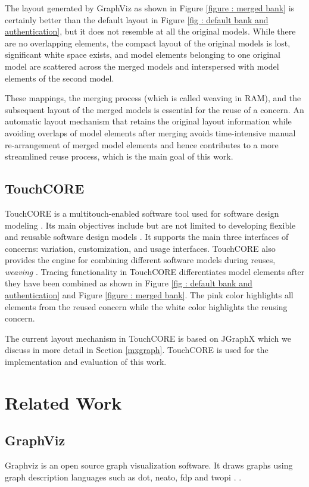 The  layout generated by GraphViz  as shown in Figure \ref{figure : merged bank} is certainly better than the default layout in Figure \ref{fig : default bank and authentication}, but it does not resemble at all the original models. While there are no overlapping elements, the compact layout of the original models is lost, significant white space exists, and model elements belonging to one original model are scattered across the merged models and interspersed with model elements of the second model.

These mappings, the merging process (which is called weaving in RAM), and the subsequent layout of the merged models is essential for the reuse of a concern. An automatic layout mechanism that retains the original layout information while avoiding overlaps of model elements after merging avoids time-intensive manual re-arrangement of merged model elements and hence contributes to a more streamlined reuse process, which is the main goal of this work.

\subsection{TouchCORE} \label{touchcore}
TouchCORE is a multitouch-enabled software tool used for software design modeling \cite{TouchCORE}. Its main objectives include but are not limited to developing flexible and reusable software design models \cite{kienzle2012b}. It supports the main three interfaces of concerns: variation, customization, and usage interfaces. TouchCORE also provides the engine for combining different software models during reuses, \textit{weaving} \cite{kienzle2012b}. Tracing functionality in TouchCORE differentiates model elements after they have been combined as shown in Figure \ref{fig : default bank and authentication} and Figure \ref{figure : merged bank}. The pink color highlights all elements from the reused concern while the white color highlights the reusing concern.

The current layout mechanism in TouchCORE is based on JGraphX which we discuss in more detail in Section \ref{mxgraph}. TouchCORE is used for the implementation and evaluation of this work.

\section{Related Work}\label{related work}
\subsection{GraphViz} \label{graphviz}
Graphviz is an open source graph visualization software. It draws graphs using graph description languages such as dot, neato, fdp and twopi \cite{graphviz}. .

